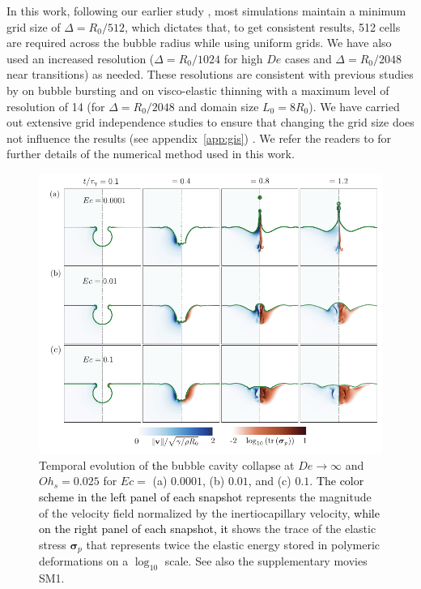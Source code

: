 \documentclass{jfm}
\newcommand{\DL}[1]{{\textcolor{black}{#1}}}
\newcommand{\AO}[1]{{\textcolor{black}{#1}}}
\newcommand{\AKD}[1]{{\textcolor{black}{#1}}}
\newcommand{\oo}{\color{black} \normalfont}
\newcommand{\bb}{\color{black} \normalfont}
\begin{document}
In this work, following our earlier study \citep{sanjay2021bursting}, most simulations maintain a minimum grid size of $\Delta = R_0/512$, which dictates that, to get consistent results, 512 cells are required across the bubble radius while using uniform grids.
We have also used an increased resolution ($\Delta = R_0/1024$ for high $De$ cases and $\Delta = R_0/2048$ near transitions) as needed. 
\oo
These resolutions are consistent with previous studies by \citet{berny2020role,berny2021statistics} on bubble bursting and \citet{turkoz2018axisymmetric,turkoz2021simulation} on visco-elastic thinning with a maximum level of resolution of 14 (for $\Delta = R_0/2048$ and domain size $L_0 = 8R_0$).
\bb 
We have carried out extensive grid independence studies to ensure that changing the grid size does not influence the results \oo (see appendix~\ref{app:gis})\bb. We refer the readers to \citet{popinet2015quadtree,VatsalThesis,Sanjay2024code} for further details of the numerical method used in this work.

\begin{figure}
	\includegraphics[width=\textwidth]{Facets_time_Oh_HighDe_07-eps-converted-to.pdf}
	\caption{Temporal evolution of \DL{the} bubble cavity collapse at $De \to \infty$ and $Oh_s = 0.025$ for $Ec =$ (a) $0.0001$, (b) $0.01$\AKD{,} and (c) $0.1$. \AO{The color scheme in the left panel of each snapshot} represents the magnitude of the velocity field normalized by the inertiocapillary velocity, \AO{while on the right panel of each snapshot, it} shows the trace of the elastic stress $\boldsymbol{\sigma}_p$ that represents twice the elastic energy stored in polymeric deformations on a $\log_{10}$ scale. See also the supplementary movies SM1.}
	\label{facets_time_highDe}
\end{figure}
\end{document}
